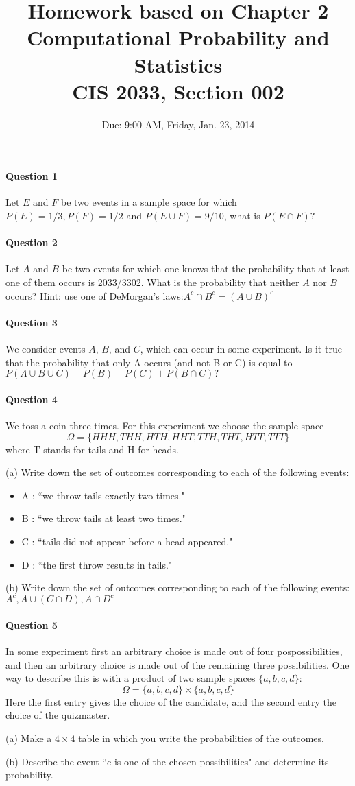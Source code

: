 \documentclass[11pt]{article} %
\title{Homework based on Chapter 2\\
Computational Probability and Statistics \\
CIS 2033, Section 002}
\author{Due: 9:00 AM, Friday, Jan. 23, 2014}
\date{} %
\begin{document}
\maketitle

\paragraph*{Question 1}
Let $E$ and $F$ be two events in a sample space for which $P(E) = 1/3, P(F)=1/2$ and $P(E \cup F) = 9/10$, what is $P(E \cap F)?$

\paragraph*{Question 2}
Let $A$ and $B$ be two events for which one knows that the probability that at least one of them occurs is 2033/3302. What is the probability that neither $A$ nor $B$ occurs? Hint: use one of DeMorgan’s laws:$A^c \cap B^c = (A \cup B)^c$

\paragraph*{Question 3}
We consider events $A$, $B$, and $C$, which can occur in some experiment. Is it true that the probability that only A occurs (and not B or C) is equal to $P(A \cup B \cup C) - P(B) - P(C) + P(B \cap C)?$

\paragraph*{Question 4}
We toss a coin three times. For this experiment we choose the sample space
\[
\Omega = \{HHH, THH, HTH, HHT, TTH, THT, HTT, TTT \}
\]
where T stands for tails and H for heads.

(a) Write down the set of outcomes corresponding to each of the following
events:
\begin{itemize}
\item A : ``we throw tails exactly two times."
\item B : ``we throw tails at least two times."
\item C : ``tails did not appear before a head appeared."
\item D : ``the first throw results in tails."
\end{itemize}
(b) Write down the set of outcomes corresponding to each of the following
events:
$A^c , A \cup (C \cap D), A \cap D^c$

\paragraph*{Question 5}
In some experiment first an arbitrary choice is made out of four pospossibilities, and then an arbitrary choice is made out of the remaining three possibilities. One way to describe this is with a product of two sample spaces $\{a, b, c, d\}$:
\[
\Omega = \{a, b, c, d\} \times \{a, b, c, d\}
\]
Here the first entry gives the choice of the candidate, and the second entry the choice of the quizmaster.

(a) Make a $4 \times 4$ table in which you write the probabilities of the outcomes.

(b) Describe the event ``c is one of the chosen possibilities" and determine its probability.
\end{document}

